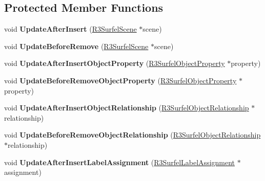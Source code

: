 \subsection*{Protected Member Functions}
\begin{DoxyCompactItemize}
\item 
void {\bfseries Update\+After\+Insert} (\hyperlink{class_r3_surfel_scene}{R3\+Surfel\+Scene} $\ast$scene)\hypertarget{class_r3_surfel_object_a36aee871d62a0c3285abd23476d250b8}{}\label{class_r3_surfel_object_a36aee871d62a0c3285abd23476d250b8}

\item 
void {\bfseries Update\+Before\+Remove} (\hyperlink{class_r3_surfel_scene}{R3\+Surfel\+Scene} $\ast$scene)\hypertarget{class_r3_surfel_object_ae5c3f276518cee6758bc2476539ca9e6}{}\label{class_r3_surfel_object_ae5c3f276518cee6758bc2476539ca9e6}

\item 
void {\bfseries Update\+After\+Insert\+Object\+Property} (\hyperlink{class_r3_surfel_object_property}{R3\+Surfel\+Object\+Property} $\ast$property)\hypertarget{class_r3_surfel_object_a058781cea98717586081d76ce4f81052}{}\label{class_r3_surfel_object_a058781cea98717586081d76ce4f81052}

\item 
void {\bfseries Update\+Before\+Remove\+Object\+Property} (\hyperlink{class_r3_surfel_object_property}{R3\+Surfel\+Object\+Property} $\ast$property)\hypertarget{class_r3_surfel_object_a5e30de5068e4e5156bf09207a6e6329c}{}\label{class_r3_surfel_object_a5e30de5068e4e5156bf09207a6e6329c}

\item 
void {\bfseries Update\+After\+Insert\+Object\+Relationship} (\hyperlink{class_r3_surfel_object_relationship}{R3\+Surfel\+Object\+Relationship} $\ast$relationship)\hypertarget{class_r3_surfel_object_aa1e19fa158cb4b26c07415fc681bf452}{}\label{class_r3_surfel_object_aa1e19fa158cb4b26c07415fc681bf452}

\item 
void {\bfseries Update\+Before\+Remove\+Object\+Relationship} (\hyperlink{class_r3_surfel_object_relationship}{R3\+Surfel\+Object\+Relationship} $\ast$relationship)\hypertarget{class_r3_surfel_object_a262a1d06daf8889f6c8a70344ad93de5}{}\label{class_r3_surfel_object_a262a1d06daf8889f6c8a70344ad93de5}

\item 
void {\bfseries Update\+After\+Insert\+Label\+Assignment} (\hyperlink{class_r3_surfel_label_assignment}{R3\+Surfel\+Label\+Assignment} $\ast$assignment)\hypertarget{class_r3_surfel_object_ab89c774146b2424b6ce2d08e16849c67}{}\label{class_r3_surfel_object_ab89c774146b2424b6ce2d08e16849c67}


\end{DoxyCompactItemize}

